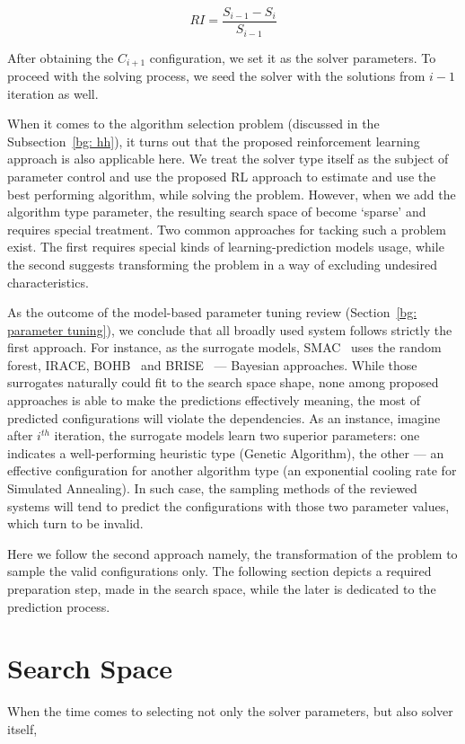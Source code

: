 \begin{equation}
RI = \frac{S_{i-1} - S_{i}}{S_{i-1}}
\label{concept: RI formula}
\end{equation}

After obtaining the $C_{i+1}$ configuration, we set it as the solver parameters. To proceed with the solving process, we seed the solver with the solutions from $i-1$ iteration as well.

When it comes to the algorithm selection problem (discussed in the Subsection~\ref{bg: hh}), it turns out that the proposed reinforcement learning approach is also applicable here. We treat the solver type itself as the subject of parameter control and use the proposed RL approach to estimate and use the best performing algorithm, while solving the problem. However, when we add the algorithm type parameter, the resulting search space of become `sparse' and requires special treatment. Two common approaches for tacking such a problem exist. The first requires special kinds of learning-prediction models usage, while the second suggests transforming the problem in a way of excluding undesired characteristics.

As the outcome of the model-based parameter tuning review (Section~\ref{bg: parameter tuning}), we conclude that all broadly used system follows strictly the first approach. For instance, as the surrogate models, SMAC~\cite{hutter2011sequential} uses the random forest, IRACE\cite{lopez2016irace}, BOHB~\cite{falkner2018bohb} and BRISE~\cite{brise2spl} — Bayesian approaches. While those surrogates naturally could fit to the search space shape, none among proposed approaches is able to make the predictions effectively meaning, the most of predicted configurations will violate the dependencies. As an instance, imagine after $i^{th}$ iteration, the surrogate models learn two superior parameters: one indicates a well-performing heuristic type (Genetic Algorithm), the other — an effective configuration for another algorithm type (an exponential cooling rate for Simulated Annealing). In such case, the sampling methods of the reviewed systems will tend to predict the configurations with those two parameter values, which turn to be invalid.

Here we follow the second approach namely, the transformation of the problem to sample the valid configurations only. The following section depicts a required preparation step, made in the search space, while the later is dedicated to the prediction process.


\section{Search Space}\label{concept:search space}
When the time comes to selecting not only the solver parameters, but also solver itself, 
